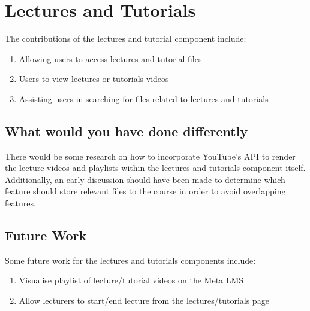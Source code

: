 \section{Lectures and Tutorials}
The contributions of the lectures and tutorial component include:
\begin{enumerate}
    \item Allowing users to access lectures and tutorial files
    \item Users to view lectures or tutorials videos 
    \item Assisting users in searching for files related to lectures and tutorials
\end{enumerate}

\subsection{What would you have done differently}
There would be some research on how to incorporate YouTube's API to render the lecture videos and playlists within the lectures and tutorials component itself. Additionally, an early discussion should have been made to determine which feature should store relevant files to the course in order to avoid overlapping features. 

\subsection{Future Work}
Some future work for the lectures and tutorials components include:
\begin{enumerate}
    \item Visualise playlist of lecture/tutorial videos on the Meta LMS
    \item Allow lecturers to start/end lecture from the lectures/tutorials page
\end{enumerate}